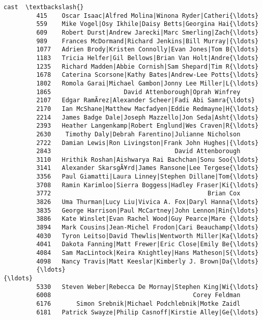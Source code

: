\documentclass[11pt]{article}
\begin{document}
\begin{Verbatim}[commandchars=\\\{\}]
                                                             cast  \textbackslash{}
         415    Oscar Isaac|Alfred Molina|Winona Ryder|Catheri{\ldots}   
         559    Mike Vogel|Osy Ikhile|Daisy Betts|Georgina Hai{\ldots}   
         609    Robert Durst|Andrew Jarecki|Marc Smerling|Zach{\ldots}   
         989    Frances McDormand|Richard Jenkins|Bill Murray|{\ldots}   
         1077   Adrien Brody|Kristen Connolly|Evan Jones|Tom B{\ldots}   
         1183   Tricia Helfer|Gil Bellows|Brian Van Holt|Andre{\ldots}   
         1235   Richard Madden|Abbie Cornish|Sam Shepard|Tim R{\ldots}   
         1678   Caterina Scorsone|Kathy Bates|Andrew-Lee Potts{\ldots}   
         1802   Romola Garai|Michael Gambon|Jonny Lee Miller|L{\ldots}   
         1865                    David Attenborough|Oprah Winfrey   
         2107   Edgar RamÃ­rez|Alexander Scheer|Fadi Abi Samra{\ldots}   
         2170   Ian McShane|Matthew Macfadyen|Eddie Redmayne|H{\ldots}   
         2214   James Badge Dale|Joseph Mazzello|Jon Seda|Asht{\ldots}   
         2393   Heather Langenkamp|Robert Englund|Wes Craven|R{\ldots}   
         2630    Timothy Daly|Debrah Farentino|Julianne Nicholson   
         2722   Damian Lewis|Ron Livingston|Frank John Hughes|{\ldots}   
         2843                                  David Attenborough   
         3110   Hrithik Roshan|Aishwarya Rai Bachchan|Sonu Soo{\ldots}   
         3141   Alexander SkarsgÃ¥rd|James Ransone|Lee Tergese{\ldots}   
         3356   Paul Giamatti|Laura Linney|Stephen Dillane|Tom{\ldots}   
         3708   Ramin Karimloo|Sierra Boggess|Hadley Fraser|Ki{\ldots}   
         3772                                           Brian Cox   
         3826   Uma Thurman|Lucy Liu|Vivica A. Fox|Daryl Hanna{\ldots}   
         3835   George Harrison|Paul McCartney|John Lennon|Rin{\ldots}   
         3886   Kate Winslet|Evan Rachel Wood|Guy Pearce|Mare {\ldots}   
         3894   Mark Cousins|Jean-Michel Frodon|Cari Beauchamp{\ldots}   
         4030   Tyron Leitso|David Thewlis|Wentworth Miller|Ka{\ldots}   
         4041   Dakota Fanning|Matt Frewer|Eric Close|Emily Be{\ldots}   
         4084   Sam MacLintock|Keira Knightley|Hans Matheson|S{\ldots}   
         4098   Nancy Travis|Matt Keeslar|Kimberly J. Brown|Da{\ldots}   
         {\ldots}                                                  {\ldots}   
         5330   Steven Weber|Rebecca De Mornay|Stephen King|Wi{\ldots}   
         6008                                       Corey Feldman   
         6176       Simon Srebnik|Michael Podchlebnik|Motke Zaidl   
         6181   Patrick Swayze|Philip Casnoff|Kirstie Alley|Ge{\ldots}   

\end{Verbatim}
\end{document}
